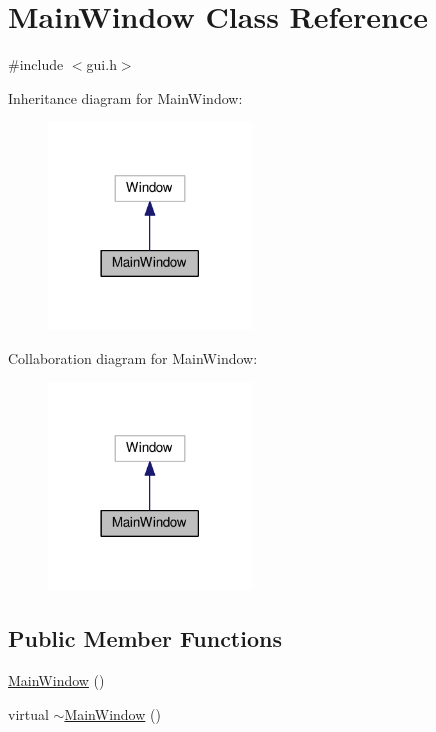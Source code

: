 \hypertarget{class_main_window}{}\section{Main\+Window Class Reference}
\label{class_main_window}


{\ttfamily \#include $<$gui.\+h$>$}



Inheritance diagram for Main\+Window\+:\nopagebreak
\begin{figure}[H]
\begin{center}
\leavevmode
\includegraphics[width=153pt]{class_main_window__inherit__graph}
\end{center}
\end{figure}


Collaboration diagram for Main\+Window\+:\nopagebreak
\begin{figure}[H]
\begin{center}
\leavevmode
\includegraphics[width=153pt]{class_main_window__coll__graph}
\end{center}
\end{figure}
\subsection*{Public Member Functions}
\begin{DoxyCompactItemize}
\item 
\hyperlink{class_main_window_a34c4b4207b46d11a4100c9b19f0e81bb}{Main\+Window} ()
\item 
virtual \hyperlink{class_main_window_ae98d00a93bc118200eeef9f9bba1dba7}{$\sim$\+Main\+Window} ()
\end{DoxyCompactItemize}

